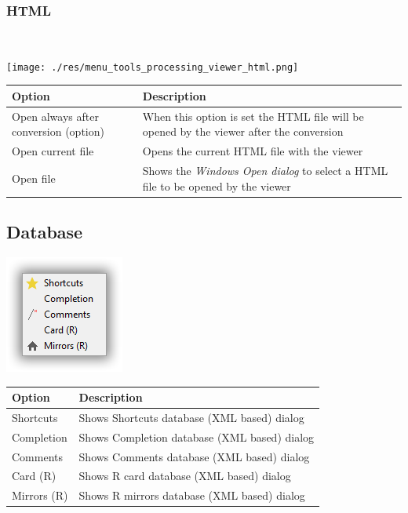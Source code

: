 \hypertarget{menu_tools_processing_viewer_html}{}
\subsubsection{HTML}\\

\texttt{[image: ./res/menu\_tools\_processing\_viewer\_html.png]}\\

\begin{scriptsize}
  \begin{tabularx}{\textwidth}{>{\hsize=0.7\hsize}X>{\hsize=0.7\hsize}X}\\
    \hline
    \textbf{Option} & \textbf{Description} \\
    \hline
    Open always after conversion (option) & When this option is set the HTML file will be opened by the viewer after the conversion \\
    Open current file & Opens the current HTML file with the viewer \\
    Open file & Shows the \textit{Windows Open dialog} to select a HTML file to be opened by the viewer \\
    \hline
  \end{tabularx}
\end{scriptsize}


\hypertarget{menu_tools_database}{}
\subsection{Database}

\includegraphics[scale=0.50]{./res/menu_tools_database.png}\\

\begin{scriptsize}
  \begin{tabularx}{\textwidth}{>{\hsize=0.3\hsize}X>{\hsize=0.7\hsize}X}\\
    \hline
    \textbf{Option} & \textbf{Description} \\
    \hline
    Shortcuts & Shows Shortcuts database (XML based) dialog \\
    Completion & Shows Completion database (XML based) dialog \\
    Comments & Shows Comments database (XML based) dialog \\
    Card (R) & Shows R card database (XML based) dialog \\
    Mirrors (R) & Shows R mirrors database (XML based) dialog \\
    \hline
  \end{tabularx}
\end{scriptsize}


